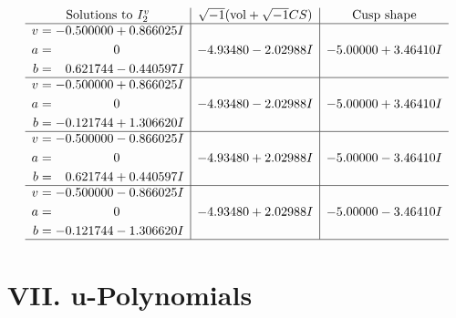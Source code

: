 \documentclass[1p]{elsarticle_modified}
\theoremstyle{definition}
\newcommand{\I}{\sqrt{-1}}
\begin{document}
$$\begin{array}{c|c|c}  
\text{Solutions to }I^v_{2}& \I (\text{vol} + \sqrt{-1}CS) & \text{Cusp shape}\\
 \hline 
\begin{aligned}
v &= -0.500000 + 0.866025 I \\
a &= \phantom{-0.000000 } 0 \\
b &= \phantom{-}0.621744 - 0.440597 I\end{aligned}
 & -4.93480 - 2.02988 I & -5.00000 + 3.46410 I \\ \hline\begin{aligned}
v &= -0.500000 + 0.866025 I \\
a &= \phantom{-0.000000 } 0 \\
b &= -0.121744 + 1.306620 I\end{aligned}
 & -4.93480 - 2.02988 I & -5.00000 + 3.46410 I \\ \hline\begin{aligned}
v &= -0.500000 - 0.866025 I \\
a &= \phantom{-0.000000 } 0 \\
b &= \phantom{-}0.621744 + 0.440597 I\end{aligned}
 & -4.93480 + 2.02988 I & -5.00000 - 3.46410 I \\ \hline\begin{aligned}
v &= -0.500000 - 0.866025 I \\
a &= \phantom{-0.000000 } 0 \\
b &= -0.121744 - 1.306620 I\end{aligned}
 & -4.93480 + 2.02988 I & -5.00000 - 3.46410 I\\
 \hline 
 \end{array}$$\newpage
\newpage\renewcommand{\arraystretch}{1}
\centering \section*{ VII. u-Polynomials}
\end{document}
